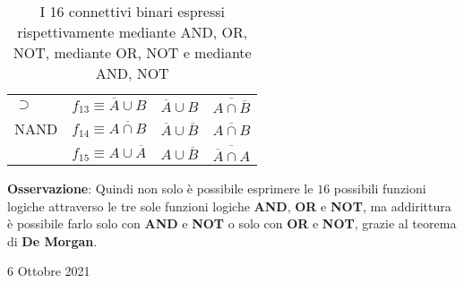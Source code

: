 \documentclass[a4paper]{extarticle}
\begin{document}
\begin{table}[H]
\begin{tabularx}{\textwidth}{|P||l|l|l|}
         $\supset$ & $f_{13} \equiv \overline{A} \cup B$ & $\overline{A} \cup B$ & $\overline{A \cap \overline{B}}$\\
         NAND & $f_{14} \equiv \overline{A \cap B}$ & $\overline{A} \cup \overline{B}$ & $\overline{A \cap B}$\\
         $ $ & $f_{15} \equiv A \cup \overline{A}$ & $A \cup \overline{B}$ & $\overline{\overline{A} \cap A}$\\
         \hline
    \end{tabularx}
    \caption{I 16 connettivi binari espressi rispettivamente mediante AND, OR, NOT, mediante OR, NOT e mediante AND, NOT}
    \label{tab:connettivi_espressi_con_AND_OR_NOT_OR_NOT_AND_NOT}
\end{table}

\noindent
\textbf{Osservazione}: Quindi non solo è possibile esprimere le \(16\) possibili funzioni logiche attraverso le tre sole funzioni logiche \textbf{AND}, \textbf{OR} e \textbf{NOT}, ma addirittura è possibile farlo solo con \textbf{AND} e \textbf{NOT} o solo con \textbf{OR} e \textbf{NOT}, grazie al teorema di \textbf{De Morgan}.

\newpage
\begin{center}
    6 Ottobre 2021
\end{center}
\end{document}
